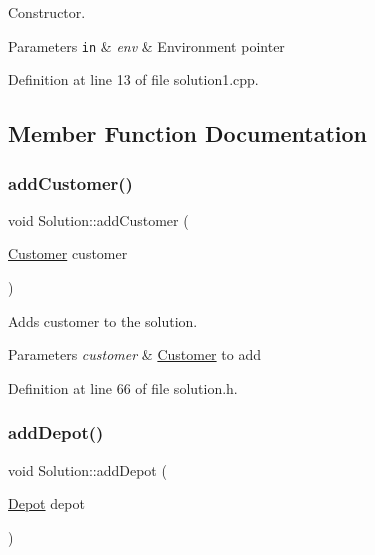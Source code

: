 Constructor. 


\begin{DoxyParams}[1]{Parameters}
\mbox{\tt in}  & {\em env} & Environment pointer \\
\hline
\end{DoxyParams}


Definition at line 13 of file solution1.\+cpp.



\subsection{Member Function Documentation}
\mbox{\label{class_solution_a360f5711f6da7daba2d4eff39bfb00fc}} 
\subsubsection{\texorpdfstring{add\+Customer()}{addCustomer()}}
{\footnotesize\ttfamily void Solution\+::add\+Customer (\begin{DoxyParamCaption}\item[{\hyperlink{class_customer}{Customer}}]{customer }\end{DoxyParamCaption})\hspace{0.3cm}{\ttfamily [inline]}}

Adds customer to the solution. 
\begin{DoxyParams}{Parameters}
{\em customer} & \hyperlink{class_customer}{Customer} to add \\
\hline
\end{DoxyParams}


Definition at line 66 of file solution.\+h.

\mbox{\label{class_solution_af9d6aadb375d6e9ddadc8fcf31a53cf6}} 
\subsubsection{\texorpdfstring{add\+Depot()}{addDepot()}}
{\footnotesize\ttfamily void Solution\+::add\+Depot (\begin{DoxyParamCaption}\item[{\hyperlink{class_depot}{Depot}}]{depot }\end{DoxyParamCaption})\hspace{0.3cm}{\ttfamily [inline]}}

